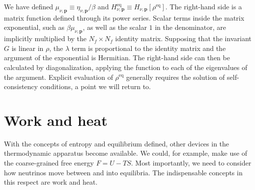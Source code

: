 \documentclass[aps,prd,twocolumn,groupedaddress,preprintnumbers]{revtex4-2}
\begin{document}
We have defined $\mu_{\nu,\boldsymbol{p}} \equiv \eta_{\nu,\boldsymbol{p}} / \beta$ and $H^\textrm{eq}_{\nu,\boldsymbol{p}} \equiv H_{\nu,\boldsymbol{p}} [ \rho^\textrm{eq} ]$. The right-hand side is a matrix function defined through its power series. Scalar terms inside the matrix exponential, such as $\beta\mu_{\nu,\boldsymbol{p}}$, as well as the scalar $1$ in the denominator, are implicitly multiplied by the $N_f \times N_f$ identity matrix. Supposing that the invariant $G$ is linear in $\rho$, the $\lambda$ term is proportional to the identity matrix and the argument of the exponential is Hermitian. The right-hand side can then be calculated by diagonalization, applying the function to each of the eigenvalues of the argument. Explicit evaluation of $\rho^\textrm{eq}$ generally requires the solution of self-consistency conditions, a point we will return to.










\section{Work and heat}

With the concepts of entropy and equilibrium defined, other devices in the thermodynamic apparatus become available. We could, for example, make use of the coarse-grained free energy $F = U - TS$. Most importantly, we need to consider how neutrinos move between and into equilibria. The indispensable concepts in this respect are work and heat. 
\end{document}
